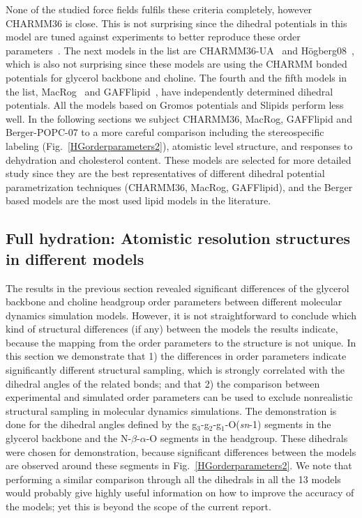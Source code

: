 \documentclass[journal=jpcbfk,manuscript=article]{achemso}
\begin{document}
None of the studied force fields fulfils these criteria completely, however CHARMM36 is close. 
This is not surprising since the dihedral potentials in this model are tuned against experiments to better reproduce these 
order parameters~\cite{klauda10}.
The next models in the list are CHARMM36-UA~\cite{henin08,lee14} and H\"ogberg08~\cite{hogberg08}, which is also not surprising since
these models are using the CHARMM bonded potentials for glycerol backbone and choline. The fourth and the fifth models in the list, MacRog~\cite{maciejewski14} and
GAFFlipid~\cite{dickson12}, have independently determined dihedral potentials. All the models based on Gromos potentials and Slipids perform less well.
In the following sections we subject CHARMM36, MacRog, GAFFlipid and Berger-POPC-07 to a more careful comparison including the stereospecific labeling  
(Fig.~\ref{HGorderparameters2}), atomistic level structure, and responses to dehydration and cholesterol content.
These models are selected for more detailed study since they are the best representatives of different dihedral potential parametrization techniques 
(CHARMM36, MacRog, GAFFlipid), and the Berger based models are the most used lipid models in the literature.


\subsection{Full hydration: Atomistic resolution structures in different models}

The results in the previous section revealed significant differences of the glycerol backbone and choline headgroup
order parameters between different molecular dynamics simulation models.
However, it is not straightforward to conclude which kind of structural differences (if any)
between the models the results indicate, because the mapping from the order parameters to the 
structure is not unique. In this section we demonstrate that 1) the differences in order parameters
indicate significantly different structural sampling, which is strongly correlated with the dihedral angles of the related bonds;
and that 2) the comparison between experimental and simulated order parameters can be used to exclude
nonrealistic structural sampling in molecular dynamics simulations. The demonstration is done for 
the dihedral angles defined by the g$_3$-g$_2$-g$_1$-O(\textit{sn}-1) segments in the glycerol backbone and 
the N-$\beta$-$\alpha$-O segments in the headgroup. These dihedrals were chosen for demonstration, because 
significant differences between the models are observed around these segments in Fig.~\ref{HGorderparameters2}.
We note that performing a similar comparison through all the dihedrals in all the 13 models would probably give highly useful
information on how to improve the accuracy of the models; yet this is beyond the scope of the current report. 
\end{document}
